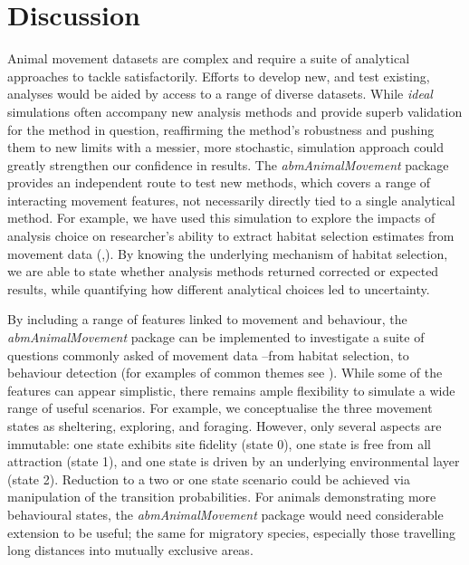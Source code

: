 \documentclass[10pt,a4paper]{article}
\begin{document}
\section{Discussion}\label{discussion}

Animal movement datasets are complex and require a suite of analytical approaches to tackle satisfactorily.
Efforts to develop new, and test existing, analyses would be aided by access to a range of diverse datasets.
While \emph{ideal} simulations often accompany new analysis methods and provide superb validation for the method in question, reaffirming the method's robustness and pushing them to new limits with a messier, more stochastic, simulation approach could greatly strengthen our confidence in results.
The \emph{abmAnimalMovement} package provides an independent route to test new methods, which covers a range of interacting movement features, not necessarily directly tied to a single analytical method.
For example, we have used this simulation to explore the impacts of analysis choice on researcher's ability to extract habitat selection estimates from movement data (,).
By knowing the underlying mechanism of habitat selection, we are able to state whether analysis methods returned corrected or expected results, while quantifying how different analytical choices led to uncertainty.

By including a range of features linked to movement and behaviour, the \emph{abmAnimalMovement} package can be implemented to investigate a suite of questions commonly asked of movement data --from habitat selection, to behaviour detection (for examples of common themes see ).
While some of the features can appear simplistic, there remains ample flexibility to simulate a wide range of useful scenarios.
For example, we conceptualise the three movement states as sheltering, exploring, and foraging.
However, only several aspects are immutable: one state exhibits site fidelity (state 0), one state is free from all attraction (state 1), and one state is driven by an underlying environmental layer (state 2).
Reduction to a two or one state scenario could be achieved via manipulation of the transition probabilities.
For animals demonstrating more behavioural states, the \emph{abmAnimalMovement} package would need considerable extension to be useful; the same for migratory species, especially those travelling long distances into mutually exclusive areas.
\end{document}
